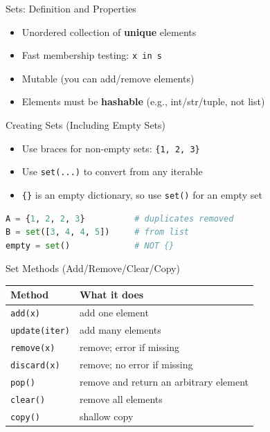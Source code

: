 \documentclass{beamer}
\begin{document}
\begin{frame}[fragile]{Sets: Definition and Properties}
  \begin{itemize}[<+->]
    \item Unordered collection of \textbf{unique} elements
    \item Fast membership testing: \texttt{x in s}
    \item Mutable (you can add/remove elements)
    \item Elements must be \textbf{hashable} (e.g., int/str/tuple, not list)
  \end{itemize}
\end{frame}

\begin{frame}[fragile]{Creating Sets (Including Empty Sets)}
  \begin{itemize}[<+->]
    \item Use braces for non-empty sets: \texttt{\{1, 2, 3\}}
    \item Use \texttt{set(...)} to convert from any iterable
    \item \texttt{\{\}} is an empty dictionary, so use \texttt{set()} for an empty set
  \end{itemize}
  \vspace{0.3em}
  \begin{lstlisting}[language=Python]
A = {1, 2, 2, 3}          # duplicates removed
B = set([3, 4, 4, 5])     # from list
empty = set()             # NOT {}
  \end{lstlisting}
\end{frame}

\begin{frame}[fragile]{Set Methods (Add/Remove/Clear/Copy)}
  \small
  \begin{tabular}{ll}
    \toprule
    Method & What it does \\
    \midrule
    \texttt{add(x)} & add one element \\
    \texttt{update(iter)} & add many elements \\
    \texttt{remove(x)} & remove; error if missing \\
    \texttt{discard(x)} & remove; no error if missing \\
    \texttt{pop()} & remove and return an arbitrary element \\
    \texttt{clear()} & remove all elements \\
    \texttt{copy()} & shallow copy \\
    \bottomrule
  \end{tabular}
  \normalsize
\end{frame}
\end{document}
